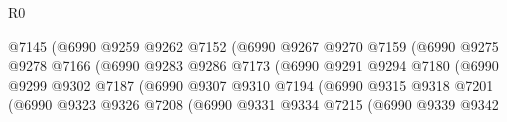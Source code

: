 \begin{lexlean}{R0}
\begin{coremodule}
                                          @7145
                                          (@6990
                                            @9259
                                            @9262
                                            @7152
                                            (@6990
                                              @9267
                                              @9270
                                              @7159
                                              (@6990
                                                @9275
                                                @9278
                                                @7166
                                                (@6990
                                                  @9283
                                                  @9286
                                                  @7173
                                                  (@6990
                                                    @9291
                                                    @9294
                                                    @7180
                                                    (@6990
                                                      @9299
                                                      @9302
                                                      @7187
                                                      (@6990
                                                        @9307
                                                        @9310
                                                        @7194
                                                        (@6990
                                                          @9315
                                                          @9318
                                                          @7201
                                                          (@6990
                                                            @9323
                                                            @9326
                                                            @7208
                                                            (@6990
                                                              @9331
                                                              @9334
                                                              @7215
                                                              (@6990
                                                                @9339
                                                                @9342

\end{coremodule}
\end{lexlean}
